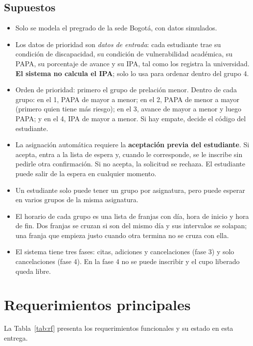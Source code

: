 \documentclass[conference]{IEEEtran}
\begin{document}
\subsection{Supuestos}
\begin{itemize}
    \item Solo se modela el pregrado de la sede Bogotá, con datos simulados.
    \item Los datos de prioridad son \emph{datos de entrada}: cada estudiante trae su condición de discapacidad, su condición de vulnerabilidad académica, su PAPA, su porcentaje de avance y su IPA, tal como los registra la universidad. \textbf{El sistema no calcula el IPA}; solo lo usa para ordenar dentro del grupo 4.
    \item Orden de prioridad: primero el grupo de prelación menor. Dentro de cada grupo: en el 1, PAPA de mayor a menor; en el 2, PAPA de menor a mayor (primero quien tiene más riesgo); en el 3, avance de mayor a menor y luego PAPA; y en el 4, IPA de mayor a menor. Si hay empate, decide el código del estudiante.
    \item La asignación automática requiere la \textbf{aceptación previa del estudiante}. Si acepta, entra a la lista de espera y, cuando le corresponde, se le inscribe sin pedirle otra confirmación. Si no acepta, la solicitud se rechaza. El estudiante puede salir de la espera en cualquier momento.
    \item Un estudiante solo puede tener un grupo por asignatura, pero puede esperar en varios grupos de la misma asignatura.
    \item El horario de cada grupo es una lista de franjas con día, hora de inicio y hora de fin. Dos franjas se cruzan si son del mismo día y sus intervalos se solapan; una franja que empieza justo cuando otra termina no se cruza con ella.
    \item El sistema tiene tres fases: citas, adiciones y cancelaciones (fase 3) y solo cancelaciones (fase 4). En la fase 4 no se puede inscribir y el cupo liberado queda libre.
\end{itemize}


\section{Requerimientos principales}

La Tabla~\ref{tab:rf} presenta los requerimientos funcionales y su estado en esta entrega.
\end{document}
